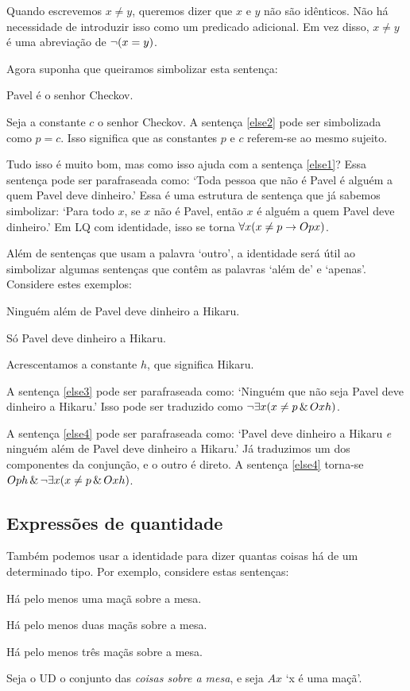 Quando escrevemos $x \neq y$, queremos dizer que $x$ e $y$ não são idênticos. Não há necessidade de introduzir isso como um predicado adicional. Em vez disso, $x \neq y$ é uma abreviação de $\neg(x = y)$.

Agora suponha que queiramos simbolizar esta sentença:
\begin{earg}
\item[\ex{else2}] Pavel é o senhor Checkov.
\end{earg}
Seja a constante $c$ o senhor Checkov. A sentença \ref{else2} pode ser simbolizada como $p=c$. Isso significa que as constantes $p$ e $c$ referem-se ao mesmo sujeito.

Tudo isso é muito bom, mas como isso ajuda com a sentença \ref{else1}? Essa sentença pode ser parafraseada como: `Toda pessoa que não é Pavel é alguém a quem Pavel deve dinheiro.' Essa é uma estrutura de sentença que já sabemos simbolizar: `Para todo $x$, se $x$ não é Pavel, então $x$ é alguém a quem Pavel deve dinheiro.' Em LQ com identidade, isso se torna $\forall x (x\neq p \rightarrow Opx)$.

Além de sentenças que usam a palavra `outro', a identidade será útil ao simbolizar algumas sentenças que contêm as palavras `além de' e `apenas'. Considere estes exemplos:

\begin{earg}
\item[\ex{else3}] Ninguém além de Pavel deve dinheiro a Hikaru.
\item[\ex{else4}] Só Pavel deve dinheiro a Hikaru.
\end{earg}

Acrescentamos a constante $h$, que significa Hikaru.

A sentença \ref{else3} pode ser parafraseada como: `Ninguém que não seja Pavel deve dinheiro a Hikaru.' Isso pode ser traduzido como $\neg\exists x(x\neq p \,\&\, Oxh)$.

A sentença \ref{else4} pode ser parafraseada como: `Pavel deve dinheiro a Hikaru \emph{e} ninguém além de Pavel deve dinheiro a Hikaru.' Já traduzimos um dos componentes da conjunção, e o outro é direto. A sentença \ref{else4} torna-se $Oph \,\&\, \neg\exists x(x\neq p \,\&\, Oxh)$.


\subsection{Expressões de quantidade}
Também podemos usar a identidade para dizer quantas coisas há de um determinado tipo. Por exemplo, considere estas sentenças:
\begin{earg}
\item[\ex{atleast1}] Há pelo menos uma maçã sobre a mesa.
\item[\ex{atleast2}] Há pelo menos duas maçãs sobre a mesa.
\item[\ex{atleast3}] Há pelo menos três maçãs sobre a mesa.
\end{earg}
Seja o UD o conjunto das \emph{coisas sobre a mesa}, e seja $Ax$ `x é uma maçã'.

